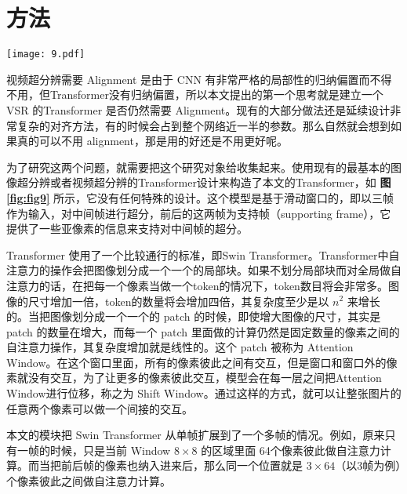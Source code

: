 \section{方法} 
\label{sec:proposed}

\begin{figure*}[!tbp]
	\centering
	\texttt{[image: 9.pdf]}
	\caption{VSR Transformer 结构示意图}
	\label{fig:fig9}
\end{figure*}

视频超分辨需要 Alignment 是由于 CNN 有非常严格的局部性的归纳偏置而不得不用，但Transformer没有归纳偏置，所以本文提出的第一个思考就是建立一个 VSR 的Transformer 是否仍然需要 Alignment。现有的大部分做法还是延续设计非常复杂的对齐方法，有的时候会占到整个网络近一半的参数。那么自然就会想到如果真的可以不用 alignment，那是用的好还是不用更好呢。

为了研究这两个问题，就需要把这个研究对象给收集起来。使用现有的最基本的图像超分辨或者视频超分辨的Transformer设计来构造了本文的Transformer，如 \textbf{图 \ref{fig:fig9}} 所示，它没有任何特殊的设计。这个模型是基于滑动窗口的，即以三帧作为输入，对中间帧进行超分，前后的这两帧为支持帧（supporting frame），它提供了一些亚像素的信息来支持对中间帧的超分。

Transformer 使用了一个比较通行的标准，即Swin Transformer。Transformer中自注意力的操作会把图像划分成一个一个的局部块。如果不划分局部块而对全局做自注意力的话，在把每一个像素当做一个token的情况下，token数目将会非常多。图像的尺寸增加一倍，token的数量将会增加四倍，其复杂度至少是以 $n^2$ 来增长的。当把图像划分成一个一个的 patch 的时候，即使增大图像的尺寸，其实是patch 的数量在增大，而每一个 patch 里面做的计算仍然是固定数量的像素之间的自注意力操作，其复杂度增加就是线性的。这个 patch 被称为 Attention Window。在这个窗口里面，所有的像素彼此之间有交互，但是窗口和窗口外的像素就没有交互，为了让更多的像素彼此交互，模型会在每一层之间把Attention Window进行位移，称之为 Shift Window。通过这样的方式，就可以让整张图片的任意两个像素可以做一个间接的交互。

本文的模块把 Swin Transformer 从单帧扩展到了一个多帧的情况。例如，原来只有一帧的时候，只是当前 Window $8 \times 8$ 的区域里面 64个像素彼此做自注意力计算。而当把前后帧的像素也纳入进来后，那么同一个位置就是 $3\times 64$（以3帧为例）个像素彼此之间做自注意力计算。

